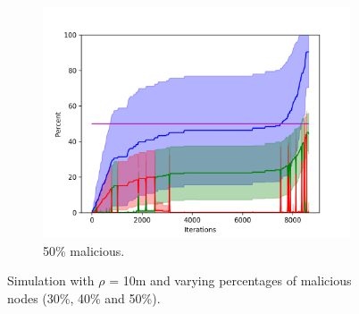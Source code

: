 \begin{figure}
\begin{subfigure}{0.6\textwidth}
\includegraphics[width=\linewidth]{images/plots/Network_rA/10_50.png}
\caption{50\% malicious.}
\end{subfigure}

\caption{Simulation with $\rho$ = 10m and varying percentages of malicious nodes (30\%, 40\% and 50\%).}
\label{fig:randommalicious2}
\end{figure}



